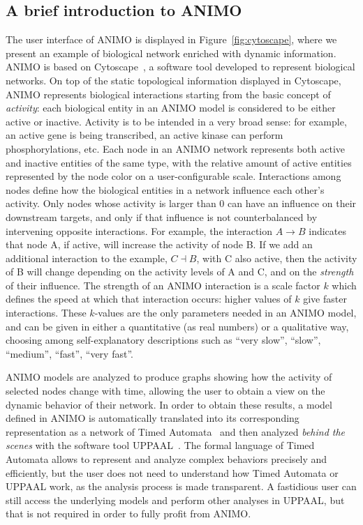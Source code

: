 \documentclass{bmcart}
\begin{document}
\subsection*{A brief introduction to ANIMO}
The user interface of ANIMO is displayed in Figure~\ref{fig:cytoscape}, where we present an example of biological network enriched with dynamic information. ANIMO is based on Cytoscape~\cite{cytoscape}, a software tool developed to represent biological networks. On top of the static topological information displayed in Cytoscape, ANIMO represents biological interactions starting from the basic concept of \emph{activity}: each biological entity in an ANIMO model is considered to be either active or inactive. Activity is to be intended in a very broad sense: for example, an active gene is being transcribed, an active kinase can perform phosphorylations, etc. Each node in an ANIMO network represents both active and inactive entities of the same type, with the relative amount of active entities represented by the node color on a user-configurable scale. Interactions among nodes define how the biological entities in a network influence each other's activity. Only nodes whose activity is larger than 0 can have an influence on their downstream targets, and only if that influence is not counterbalanced by intervening opposite interactions. For example, the interaction $A\rightarrow B$ indicates that node A, if active, will increase the activity of node B. If we add an additional interaction to the example, $C \dashv$\hspace{0.1em}$B$, with C also active, then the activity of B will change depending on the activity levels of A and C, and on the \emph{strength} of their influence. The strength of an ANIMO interaction is a scale factor $k$ which defines the speed at which that interaction occurs: higher values of $k$ give faster interactions. These $k$-values are the only parameters needed in an ANIMO model, and can be given in either a quantitative (as real numbers) or a qualitative way, choosing among self-explanatory descriptions such as ``very slow'', ``slow'', ``medium'', ``fast'', ``very fast''.

ANIMO models are analyzed to produce graphs showing how the activity of selected nodes change with time, allowing the user to obtain a view on the dynamic behavior of their network. In order to obtain these results, a model defined in ANIMO is automatically translated into its corresponding representation as a network of Timed Automata~\cite{timed-automata-alur-dill} and then analyzed \emph{behind the scenes} with the software tool UPPAAL~\cite{uppaal}. The formal language of Timed Automata allows to represent and analyze complex behaviors precisely and efficiently, but the user does not need to understand how Timed Automata or UPPAAL work, as the analysis process is made transparent. A fastidious user can still access the underlying models and perform other analyses in UPPAAL, but that is not required in order to fully profit from ANIMO.
\end{document}
